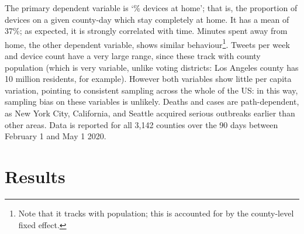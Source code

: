 \documentclass[12pt,a4]{article}
\begin{document}
The primary dependent variable is `\% devices at home'; that is, the proportion of devices on a given county-day which stay completely at home. It has a mean of 37\%; as expected, it is strongly correlated with time. Minutes spent away from home, the other dependent variable, shows similar behaviour\footnote{Note that it tracks with population; this is accounted for by the county-level fixed effect.}. Tweets per week and device count have a very large range, since these track with county population (which is very variable, unlike voting districts: Los Angeles county has 10 million residents, for example). However both variables show little per capita variation, pointing to consistent sampling across the whole of the US: in this way, sampling bias on these variables is unlikely. Deaths and cases are path-dependent, as New York City, California, and Seattle acquired serious outbreaks earlier than other areas. Data is reported for all 3,142 counties over the 90 days between February 1 and May 1 2020. 


\section{Results}%
\end{document}
